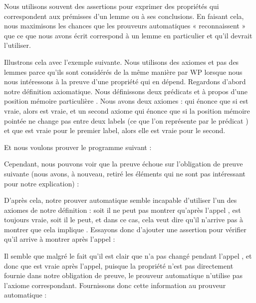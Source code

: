 

Nous utilisons souvent des assertions pour exprimer des propriétés qui
correspondent aux prémisses d'un lemme ou à ses conclusions. En faisant cela,
nous maximisons les chances que les prouveurs automatiques « reconnaissent »
que ce que nous avons écrit correspond à un lemme en particulier et qu'il
devrait l'utiliser.


Illustrons cela avec l'exemple suivante. Nous utilisons des axiomes et pas des
lemmes parce qu'ils sont considérés de la même manière par WP lorsque nous nous
intéressons à la preuve d'une propriété qui en dépend. Regardons d'abord notre
définition axiomatique. Nous définissons deux prédicats  et
 à propos d'une position mémoire particulière .
Nous avons deux axiomes :  qui énonce que si 
est vraie, alors  est vraie, et un second axiome 
qui énonce que si la position mémoire pointée ne change pas entre deux labels
(ce que l'on représente par le prédicat ) et que 
est vraie pour le premier label, alors elle est vraie pour le second.





Et nous voulons prouver le programme suivant :




Cependant, nous pouvons voir que la preuve échoue sur l'obligation de preuve
suivante (nous avons, à nouveau, retiré les éléments qui ne sont pas intéressant
pour notre explication) :




D'après cela, notre prouver automatique semble incapable d'utiliser l'un des
axiomes de notre définition : soit il ne peut pas montrer qu'après l'appel
,  est toujours vraie, soit il le peut, et
dans ce cas, cela veut dire qu'il n'arrive pas à montrer que cela implique
. Essayons donc d'ajouter une assertion pour vérifier qu'il
arrive à montrer  après l'appel :






Il semble que malgré le fait qu'il est clair que  n'a pas changé
pendant l'appel , et donc que 
est vraie après l'appel, puisque la propriété n'est pas directement fournie dans
notre obligation de preuve, le prouveur automatique n'utilise pas l'axiome
 correspondant. Fournissons donc cette information au prouveur
automatique :


